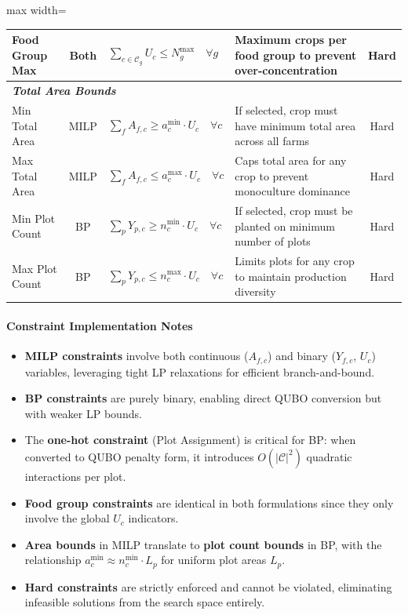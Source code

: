 \documentclass{oqireport}
\begin{document}
\begin{table}[H]
\begin{adjustbox}{max width=\textwidth}
\begin{tabular}{@{}p{2.5cm}cp{4.8cm}p{4.5cm}c@{}}
\addlinespace
Food Group Max & Both & $\sum_{c \in \mathcal{C}_g} U_c \leq N_g^{\max} \quad \forall g$ & Maximum crops per food group to prevent over-concentration & Hard \\
\midrule
\multicolumn{5}{l}{\textit{\textbf{Total Area Bounds}}} \\
\midrule
Min Total Area & MILP & $\sum_{f} A_{f,c} \geq a_c^{\min} \cdot U_c \quad \forall c$ & If selected, crop must have minimum total area across all farms & Hard \\
\addlinespace
Max Total Area & MILP & $\sum_{f} A_{f,c} \leq a_c^{\max} \cdot U_c \quad \forall c$ & Caps total area for any crop to prevent monoculture dominance & Hard \\
\addlinespace
Min Plot Count & BP & $\sum_{p} Y_{p,c} \geq n_c^{\min} \cdot U_c \quad \forall c$ & If selected, crop must be planted on minimum number of plots & Hard \\
\addlinespace
Max Plot Count & BP & $\sum_{p} Y_{p,c} \leq n_c^{\max} \cdot U_c \quad \forall c$ & Limits plots for any crop to maintain production diversity & Hard \\
\bottomrule
\end{tabular}
\end{adjustbox}
\end{table}

\paragraph{Constraint Implementation Notes}

\begin{itemize}
    \item \textbf{MILP constraints} involve both continuous ($A_{f,c}$) and binary ($Y_{f,c}$, $U_c$) variables, leveraging tight LP relaxations for efficient branch-and-bound.
    \item \textbf{BP constraints} are purely binary, enabling direct QUBO conversion but with weaker LP bounds.
    \item The \textbf{one-hot constraint} (Plot Assignment) is critical for BP: when converted to QUBO penalty form, it introduces $O(|\mathcal{C}|^2)$ quadratic interactions per plot.
    \item \textbf{Food group constraints} are identical in both formulations since they only involve the global $U_c$ indicators.
    \item \textbf{Area bounds} in MILP translate to \textbf{plot count bounds} in BP, with the relationship $a_c^{\min} \approx n_c^{\min} \cdot L_p$ for uniform plot areas $L_p$.

    \item \textbf{Hard constraints} are strictly enforced and cannot be violated, eliminating infeasible solutions from the search space entirely.
\end{itemize}
\end{document}
